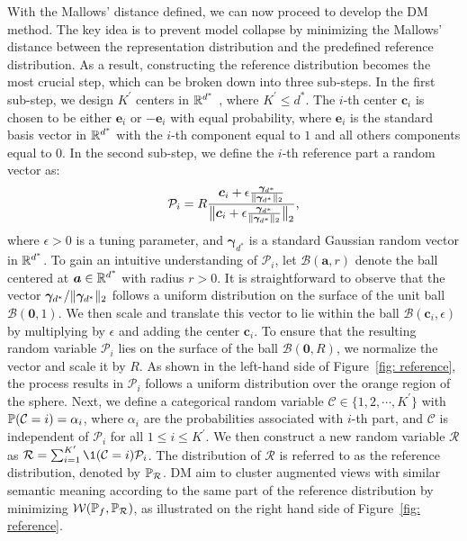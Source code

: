 With the Mallows' distance defined, we can now proceed to develop the DM method. The key idea is to prevent model collapse by minimizing the Mallows' distance between the representation distribution and the predefined reference distribution. As a result, constructing the reference distribution becomes the most crucial step, which can be broken down into three sub-steps. In the first sub-step, we design $K^\prime$ centers in $\R^{d^*}$ , where $K^\prime \leq d^*$. The $i$-th center $\bm{c}_i$ is chosen to be either $\bm{e}_i$ or $-\bm{e}_i$ with equal probability, where $\bm{e}_i$ is the standard basis vector in $\R^{d^*}$ with the $i$-th component equal to $1$ and all others components equal to $0$. In the second sub-step, we define the $i$-th reference part a random vector as:
\begin{align}\label{eq: P_i}
    \mathcal{P}_i =  R\frac{\bm{c}_i + \epsilon\frac{\bm{\gamma}_{d^*}}{\norm{\bm{\gamma}_{d^*}}_2}}{\big\Vert\bm{c}_i + \epsilon\frac{\bm{\gamma}_{d^*}}{\norm{\bm{\gamma}_{d^*}}_2}\big\Vert_2},
\end{align}
where $\epsilon > 0$ is a tuning parameter, and $\bm{\gamma}_{d^*}$ is a standard Gaussian random vector in $\R^{d^*}$. To gain an intuitive understanding of $\mathcal{P}_i$, let $\mathcal{B}(\bm{a}, r)$ denote the ball centered at $\bm{a} \in \R^{d^*}$ with radius $r > 0$. It is straightforward to observe that the vector $\bm{\gamma}_{d^*}/\norm{\bm{\gamma}_{d^*}}_2$  follows a uniform distribution on the surface of the unit ball $\mathcal{B}(\bm{0}, 1)$. We then scale and translate this vector to lie within the ball $\mathcal{B}(\bm{c}_i, \epsilon)$ by multiplying by $\epsilon$ and adding the center $\bm{c}_i$. To ensure that the resulting random variable $\mathcal{P}_i$ lies on the surface of the ball $\mathcal{B}(\bm{0}, R)$, we normalize the vector and scale it by $R$. As shown in the left-hand side of Figure~\ref{fig: reference}, the process results in $\mathcal{P}_i$ follows a uniform distribution over the orange region of the sphere. Next, we define a categorical random variable $\mathcal{C} \in \{1, 2, \cdots, K^\prime\}$ with $\P(\mathcal{C} = i) = \alpha_i$, where $\alpha_i$ are the probabilities associated with $i$-th part, and $\mathcal{C}$ is independent of $\mathcal{P}_i$ for all $1 \leq i \leq K^\prime$. We then construct a new random variable $\mathcal{R}$ as $\mathcal{R} = \sum_{i=1}^{K^\prime}\1(\mathcal{C} = i)\mathcal{P}_i$. The distribution of $\mathcal{R}$ is referred to as the reference distribution, denoted by $\P_\mathcal{R}$. DM aim to cluster augmented views with similar semantic meaning according to the same part of the reference distribution by minimizing $\mathcal{W}(\P_f, \P_\mathcal{R})$, as illustrated on the right hand side of Figure~\ref{fig: reference}.
